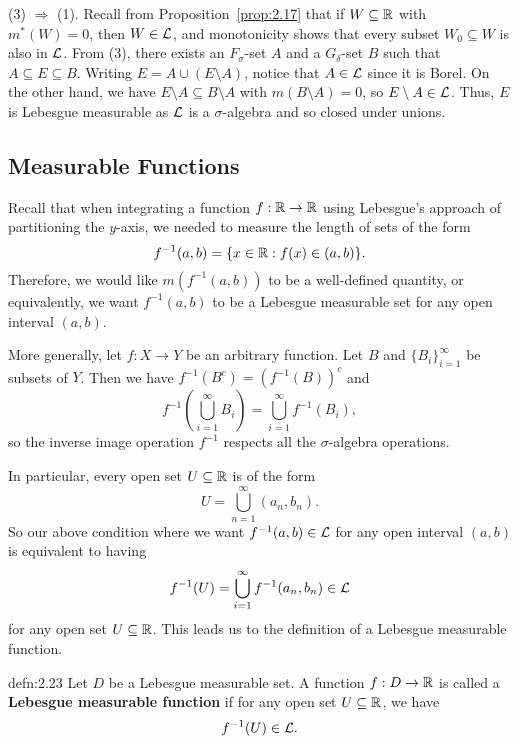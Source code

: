\begin{pf}
    (3) $\Rightarrow$ (1). Recall from Proposition~\ref{prop:2.17} that if 
    $W \subseteq \mathbb{R}$ with $m^*(W) = 0$, then $W \in {\cal L}$, and 
    monotonicity shows that every subset $W_0 \subseteq W$ is also in ${\cal L}$. 
    From (3), there exists an $F_\sigma$-set $A$ and a $G_\delta$-set $B$ 
    such that $A \subseteq E \subseteq B$. Writing $E = A \cup (E \setminus A)$, 
    notice that $A \in {\cal L}$ since it is Borel. On the other hand, 
    we have $E \setminus A \subseteq B \setminus A$ with $m(B \setminus A) = 0$, 
    so $E \setminus A \in {\cal L}$. Thus, $E$ is Lebesgue measurable as 
    ${\cal L}$ is a $\sigma$-algebra and so closed under unions. \qedhere 
\end{pf}

\subsection{Measurable Functions}\label{subsec:2.4}
Recall that when integrating a function $f : \mathbb{R} \to \mathbb{R}$ using Lebesgue's 
approach of partitioning the $y$-axis, we needed to measure the length 
of sets of the form 
\[ f^{-1}(a, b) = \{x \in \mathbb{R} : f(x) \in (a, b)\}. \] 
Therefore, we would like $m(f^{-1}(a, b))$ to be a well-defined quantity, or 
equivalently, we want $f^{-1}(a, b)$ to be a Lebesgue measurable set for 
any open interval $(a, b)$. 

More generally, let $f : X \to Y$ be an arbitrary function. Let $B$ and $\{B_i\}_{i=1}^\infty$ 
be subsets of $Y$. Then we have $f^{-1}(B^c) = (f^{-1}(B))^c$ and 
\[ f^{-1}\!\left( \bigcup_{i=1}^\infty B_i \right) = \bigcup_{i=1}^\infty 
f^{-1}(B_i), \] 
so the inverse image operation $f^{-1}$ respects all the $\sigma$-algebra operations. 

\newpage
In particular, every open set $U \subseteq \mathbb{R}$ is of the form 
\[ U = \bigcup_{n=1}^\infty (a_n, b_n). \] 
So our above condition where we want $f^{-1}(a, b) \in {\cal L}$ for any 
open interval $(a, b)$ is equivalent to having 
\[ f^{-1}(U) = \bigcup_{i=1}^\infty f^{-1}(a_n, b_n) \in {\cal L} \] 
for any open set $U \subseteq \mathbb{R}$. This leads us to the definition of a 
Lebesgue measurable function. 

\begin{defn}{defn:2.23}
    Let $D$ be a Lebesgue measurable set. A function $f : D \to \mathbb{R}$ is 
    called a {\bf Lebesgue measurable function} if for any open set 
    $U \subseteq \mathbb{R}$, we have 
    \[ f^{-1}(U) \in {\cal L}. \] 
\end{defn}

